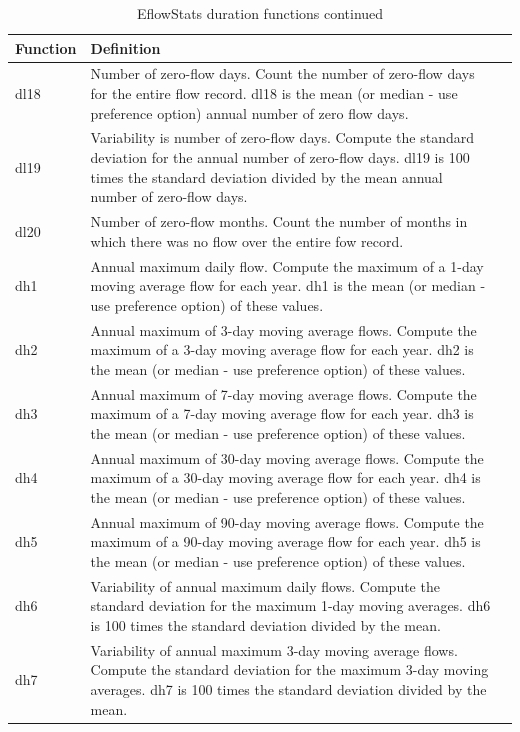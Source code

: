 \documentclass[a4paper,11pt]{article}\usepackage[]{graphicx}\usepackage[]{color}
\begin{document}
\begin{table}[ht]
  \centering
  \begin{threeparttable}[b]
  \caption{EflowStats duration functions continued}
  \label{tab:dur2Stats}
  \begin{tabularx}{\textwidth}{lXl}
  \hline
\textbf{Function} & \textbf{Definition} \\ 
  \hline
  dl18 & Number of zero-flow days. Count the number of zero-flow days for the entire flow record. dl18 is the mean (or median - use preference option) annual number of zero flow days. \\
  dl19 & Variability is number of zero-flow days. Compute the standard deviation for the annual number of zero-flow days. dl19 is 100 times the standard deviation divided by the mean annual number of zero-flow days. \\
  dl20 & Number of zero-flow months. Count the number of months in which there was no flow over the entire fow record. \\
  dh1 & Annual maximum daily flow. Compute the maximum of a 1-day moving average flow for each year. dh1 is the mean (or median - use preference option) of these values. \\
  dh2 & Annual maximum of 3-day moving average flows. Compute the maximum of a 3-day moving average flow for each year. dh2 is the mean (or median - use preference option) of these values. \\
  dh3 & Annual maximum of 7-day moving average flows. Compute the maximum of a 7-day moving average flow for each year. dh3 is the mean (or median - use preference option) of these values. \\
  dh4 & Annual maximum of 30-day moving average flows. Compute the maximum of a 30-day moving average flow for each year. dh4 is the mean (or median - use preference option) of these values. \\
  dh5 & Annual maximum of 90-day moving average flows. Compute the maximum of a 90-day moving average flow for each year. dh5 is the mean (or median - use preference option) of these values. \\
  dh6 & Variability of annual maximum daily flows. Compute the standard deviation for the maximum 1-day moving averages. dh6 is 100 times the standard deviation divided by the mean. \\
  dh7 & Variability of annual maximum 3-day moving average flows. Compute the standard deviation for the maximum 3-day moving averages. dh7 is 100 times the standard deviation divided by the mean. \\

\end{tabularx}
\end{threeparttable}
\end{table}
\end{document}
